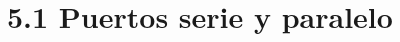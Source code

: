 \documentclass[12pt]{article}
\begin{document}
\section*{5.1 Puertos serie y paralelo}
\end{document}
